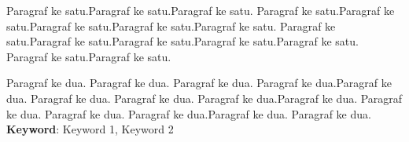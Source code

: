\begin{spacing}{1}
	
Paragraf ke satu.Paragraf ke satu.Paragraf ke satu. Paragraf ke satu.Paragraf ke satu.Paragraf ke satu.Paragraf ke satu.Paragraf ke satu. Paragraf ke satu.Paragraf ke satu.Paragraf ke satu.Paragraf ke satu.Paragraf ke satu. Paragraf ke satu.Paragraf ke satu.

Paragraf ke dua. Paragraf ke dua. Paragraf ke dua. Paragraf ke dua.Paragraf ke dua. Paragraf ke dua. Paragraf ke dua. Paragraf ke dua.Paragraf ke dua. Paragraf ke dua. Paragraf ke dua. Paragraf ke dua.Paragraf ke dua. Paragraf ke dua. \\

\vspace{2ex}
\textbf{Keyword}: Keyword 1, Keyword 2
\end{spacing}